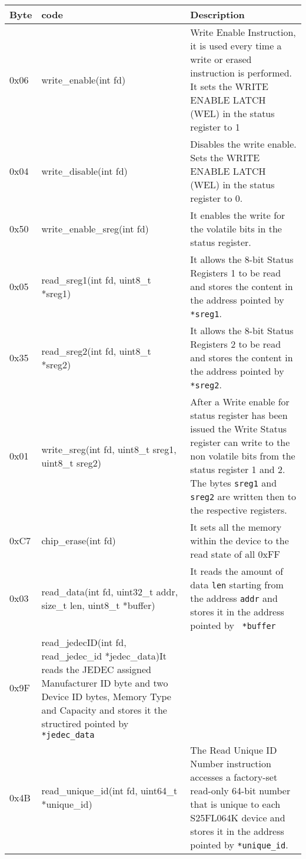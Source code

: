 \begin{table}[h!]\scriptsize
\centering
    \begin{tabular}{ | l | l | p{6cm} |}
    \hline
    Byte & code & Description \\ \hline
    0x06 & write\_enable(int fd) & Write Enable Instruction, it is used every time a write or erased instruction 
    is performed. It sets the WRITE ENABLE LATCH (WEL) in the status register to 1\\ \hline
    0x04 & write\_disable(int fd) & Disables the write enable. Sets the WRITE ENABLE LATCH (WEL) in the status register to 0.\\ \hline
    0x50 &  write\_enable\_sreg(int fd) & It enables the write for the volatile bits in the status register.\\ \hline
    0x05 & read\_sreg1(int fd, uint8\_t *sreg1) &  It allows the 8-bit Status Registers 1 to be read and stores the 
    content in the address pointed by \texttt{*sreg1}. \\ \hline
    0x35 & read\_sreg2(int fd, uint8\_t *sreg2) &  It allows the 8-bit Status Registers 2 to be read and stores the 
    content in the address pointed by \texttt{*sreg2}.\\ \hline
    0x01 & write\_sreg(int fd, uint8\_t sreg1, uint8\_t sreg2) & After a Write enable for status register has been issued the Write Status register can
    write to the non volatile bits from the  status register 1 and 2. The bytes \texttt{sreg1} and \texttt{sreg2} are written then to the respective registers.\\ \hline
    0xC7 & chip\_erase(int fd) & It sets all the memory within the device to the read state of all 0xFF\\ \hline
    0x03 & read\_data(int fd, uint32\_t addr, size\_t len, uint8\_t *buffer) & It reads the amount of data \texttt{len} starting from the address \texttt{addr} 
    and stores it in the address pointed by \texttt{ *buffer }\\ \hline
    0x9F & read\_jedecID(int fd, read\_jedec\_id *jedec\_data)It reads the JEDEC assigned Manufacturer ID byte and two Device ID
    bytes, Memory Type and Capacity and stores it the structired pointed by \texttt{*jedec\_data}\\ \hline
    0x4B & read\_unique\_id(int fd, uint64\_t *unique\_id)& The Read Unique ID Number instruction accesses a factory-set read-only 64-bit number that is unique to
    each S25FL064K device and stores it in the address pointed by \texttt{*unique\_id}.\\ \hline

\end{tabular}
\end{table}
